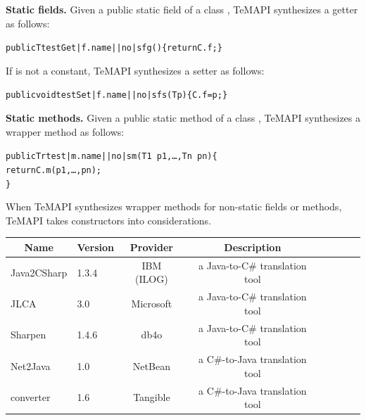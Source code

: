 \textbf{Static fields.} Given a public static field  of a class , TeMAPI synthesizes a getter as follows:

\begin{CodeOut}%
\begin{alltt}
 public T testGet|f.name||no|sfg()\{ return C.f; \}
\end{alltt}
\end{CodeOut}%

If  is not a constant, TeMAPI synthesizes a setter as follows:

\begin{CodeOut}%
\begin{alltt}
 public void testSet|f.name||no|sfs(T p)\{ C.f = p; \}
\end{alltt}
\end{CodeOut}%

\textbf{Static methods.} Given a public static method  of a class , TeMAPI synthesizes a wrapper method as follows:

\begin{CodeOut}%
\begin{alltt}
 public Tr test|m.name||no|sm(T1\ p1,\ldots, Tn\ pn)\{
   return C.m(p1,\ldots, pn);
 \}
\end{alltt}
\end{CodeOut}%

When TeMAPI synthesizes wrapper methods for non-static fields or methods, TeMAPI takes constructors into considerations.
\begin{table}[t]
\centering
\begin{SmallOut}
\begin {tabular} {|l|l|c|c|c|c|c|c|}
\hline
\multicolumn{1}{|c|}{\textbf{Name}}& \textbf{Version}& \textbf{Provider} &\textbf{Description}\\
\hline\hline
Java2CSharp  &  1.3.4 & IBM (ILOG) & a Java-to-C\# translation tool\\
\hline
JLCA         &  3.0   & Microsoft  & a Java-to-C\# translation tool\\
\hline
Sharpen      &  1.4.6 & db4o       & a Java-to-C\# translation tool \\
\hline
Net2Java     &  1.0   & NetBean    & a C\#-to-Java translation tool\\
\hline
converter    &  1.6   & Tangible   & a C\#-to-Java translation tool\\
\hline
\end{tabular}%
 \label{table:subjects}
\end{SmallOut}%
\end{table}

